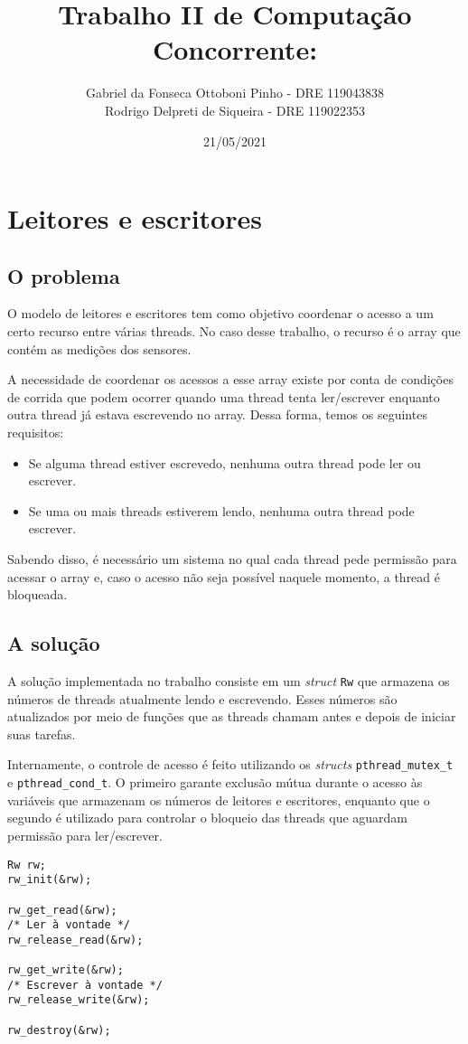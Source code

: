\documentclass[12pt]{article}
\author{Gabriel da Fonseca Ottoboni Pinho - DRE 119043838\\
Rodrigo Delpreti de Siqueira - DRE 119022353}
\title{Trabalho II de Computação Concorrente:}
\date{21/05/2021}
\begin{document}
\maketitle
\newpage

\section{Leitores e escritores}
\subsection{O problema}
O modelo de leitores e escritores
tem como objetivo coordenar o acesso
a um certo recurso entre várias threads.
No caso desse trabalho,
o recurso é o array
que contém as medições dos sensores.

A necessidade de coordenar
os acessos a esse array existe
por conta de condições de corrida
que podem ocorrer quando
uma thread tenta ler/escrever
enquanto outra thread já estava escrevendo no array.
Dessa forma, temos os seguintes requisitos:
\begin{itemize}
	\item Se alguma thread estiver escrevedo,
		nenhuma outra thread pode ler ou escrever.
	\item Se uma ou mais threads estiverem lendo,
		nenhuma outra thread pode escrever.
\end{itemize}

Sabendo disso,
é necessário um sistema
no qual cada thread pede permissão
para acessar o array e,
caso o acesso não seja possível naquele momento,
a thread é bloqueada.

\subsection{A solução}
A solução implementada no trabalho
consiste em um \textit{struct} \texttt{Rw}
que armazena os números de threads
atualmente lendo e escrevendo.
Esses números são atualizados
por meio de funções que as threads chamam
antes e depois de iniciar suas tarefas.

Internamente,
o controle de acesso é feito utilizando os \textit{structs}
\texttt{pthread\_\-mutex\_t} e \texttt{pthread\_cond\_t}.
O primeiro garante exclusão mútua durante o acesso
às variáveis que armazenam os números de leitores e escritores,
enquanto que o segundo é utilizado para controlar
o bloqueio das threads que aguardam permissão para ler/escrever.

\newpage
\begin{verbatim}
Rw rw;
rw_init(&rw);

rw_get_read(&rw);
/* Ler à vontade */
rw_release_read(&rw);

rw_get_write(&rw);
/* Escrever à vontade */
rw_release_write(&rw);

rw_destroy(&rw);
\end{verbatim}
\end{document}
